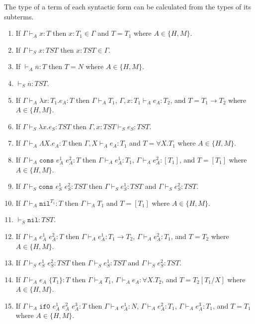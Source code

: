 \begin{lemma}
\label{i}
The type of a term of each syntactic form can be calculated from the types of its subterms.
\begin{enumerate}
\item If $\Gamma\vdash_{A}x:T$ then $x:T_{1}\in\Gamma$ and $T=T_{1}$ where $A\in\lbrace H,M\rbrace$.
\item If $\Gamma\vdash_{S}x:TST$ then $x:TST\in\Gamma$.
\item If $\vdash_{A}\overline{n}:T$ then $T=N$ where $A\in\lbrace H,M\rbrace$.
\item $\vdash_{S}\overline{n}:TST$.
\item If $\Gamma\vdash_{A}\lambda x:T_{1}.e_{A}:T$ then $\Gamma\vdash_{A}T_{1}$, $\Gamma,x:T_{1}\vdash_{A}e_{A}:T_{2}$, and $T=T_{1}\rightarrow T_{2}$ where $A\in\lbrace H,M\rbrace$.
\item If $\Gamma\vdash_{S}\lambda x.e_{S}:TST$ then $\Gamma,x:TST\vdash_{S}e_{S}:TST$.
\item If $\Gamma\vdash_{A}\Lambda X.e_{A}:T$ then $\Gamma,X\vdash_{A}e_{A}:T_{1}$ and $T=\forall X.T_{1}$ where $A\in\lbrace H,M\rbrace$.
\item If $\Gamma\vdash_{A}\mathtt{cons}$ $e_{A}^{1}$ $e_{A}^{2}:T$ then $\Gamma\vdash_{A}e_{A}^{1}:T_{1}$, $\Gamma\vdash_{A}e_{A}^{2}:[T_{1}]$, and $T=[T_{1}]$ where $A\in\lbrace H,M\rbrace$.
\item If $\Gamma\vdash_{S}\mathtt{cons}$ $e_{S}^{1}$ $e_{S}^{2}:TST$ then $\Gamma\vdash_{S}e_{S}^{1}:TST$ and $\Gamma\vdash_{S}e_{S}^{2}:TST$.
\item If $\Gamma\vdash_{A}\mathtt{nil}^{T_{1}}:T$ then $\Gamma\vdash_{A}T_{1}$ and $T=[T_{1}]$ where $A\in\lbrace H,M\rbrace$.
\item $\vdash_{S}\mathtt{nil}:TST$.
\item If $\Gamma\vdash_{A}e_{A}^{1}$ $e_{A}^{2}:T$ then $\Gamma\vdash_{A}e_{A}^{1}:T_{1}\rightarrow T_{2}$, $\Gamma\vdash_{A}e_{A}^{2}:T_{1}$, and $T=T_{2}$ where $A\in\lbrace H,M\rbrace$.
\item If $\Gamma\vdash_{S}e_{S}^{1}$ $e_{S}^{2}:TST$ then $\Gamma\vdash_{S}e_{S}^{1}:TST$ and $\Gamma\vdash_{S}e_{S}^{2}:TST$.
\item If $\Gamma\vdash_{A}e_{A}$ $\lbrace T_{1}\rbrace:T$ then $\Gamma\vdash_{A}T_{1}$, $\Gamma\vdash_{A}e_{A}:\forall X.T_{2}$, and $T=T_{2}[T_{1}/X]$ where $A\in\lbrace H,M\rbrace$.
\item If $\Gamma\vdash_{A}\mathtt{if0}$ $e_{A}^{1}$ $e_{A}^{2}$ $e_{A}^{3}:T$ then $\Gamma\vdash_{A}e_{A}^{1}:N$, $\Gamma\vdash_{A}e_{A}^{2}:T_{1}$, $\Gamma\vdash_{A}e_{A}^{3}:T_{1}$, and $T=T_{1}$ where $A\in\lbrace H,M\rbrace$.

\end{enumerate}
\end{lemma}
